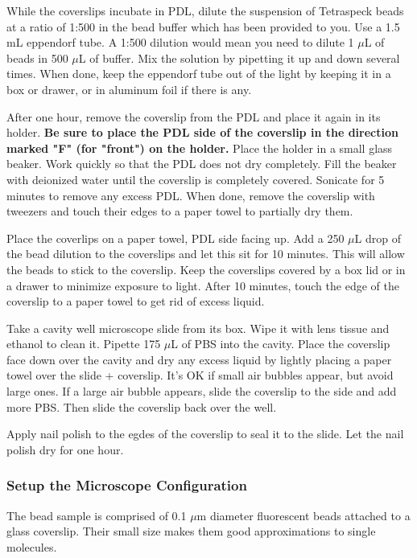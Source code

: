 \documentclass[10pt,a4paper,oneside]{book}
\begin{document}
While the coverslips incubate in PDL, dilute the suspension of Tetraspeck beads at a ratio of 1:500 in the bead buffer which has been provided to you. Use a 1.5 mL eppendorf tube. A 1:500 dilution would mean you need to dilute 1 $\mu$L of beads in 500 $\mu$L of buffer. Mix the solution by pipetting it up and down several times. When done, keep the eppendorf tube out of the light by keeping it in a box or drawer, or in aluminum foil if there is any.

After one hour, remove the coverslip from the PDL and place it again in its holder. \textbf{Be sure to place the PDL side of the coverslip in the direction marked "F" (for "front") on the holder.} Place the holder in a small glass beaker. Work quickly so that the PDL does not dry completely. Fill the beaker with deionized water until the coverslip is completely covered. Sonicate for 5 minutes to remove any excess PDL. When done, remove the coverslip with tweezers and touch their edges to a paper towel to partially dry them.

Place the coverlips on a paper towel, PDL side facing up. Add a 250 $\mu$L drop of the bead dilution to the coverslips and let this sit for 10 minutes. This will allow the beads to stick to the coverslip. Keep the coverslips covered by a box lid or in a drawer to minimize exposure to light. After 10 minutes, touch the edge of the coverslip to a paper towel to get rid of excess liquid.

Take a cavity well microscope slide from its box. Wipe it with lens tissue and ethanol to clean it. Pipette 175 $\mu$L of PBS into the cavity. Place the coverslip face down over the cavity and dry any excess liquid by lightly placing a paper towel over the slide + coverslip. It's OK if small air bubbles appear, but avoid large ones. If a large air bubble appears, slide the coverslip to the side and add more PBS. Then slide the coverslip back over the well.

Apply nail polish to the egdes of the coverslip to seal it to the slide. Let the nail polish dry for  one hour.

\subsubsection{Setup the Microscope Configuration}

The bead sample is comprised of 0.1 $\mu$m diameter fluorescent beads attached to a glass coverslip. Their small size makes them good approximations to single molecules.
\end{document}
